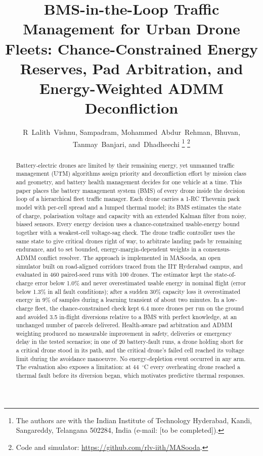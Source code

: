 \documentclass[journal]{IEEEtran}
\begin{document}
\title{BMS-in-the-Loop Traffic Management for Urban Drone Fleets: Chance-Constrained Energy Reserves, Pad Arbitration, and Energy-Weighted ADMM Deconfliction}

\author{R~Lalith~Vishnu,
        Sampadram,
        Mohammed~Abdur~Rehman,
        Bhuvan,
        Tanmay~Banjari,
        and~Dhadheechi%
\thanks{The authors are with the Indian Institute of Technology Hyderabad, Kandi, Sangareddy, Telangana 502284, India (e-mail: [to be completed]).}%
\thanks{Code and simulator: \protect\url{https://github.com/rlv-iith/MASooda}.}}


\maketitle

\begin{abstract}
Battery-electric drones are limited by their remaining energy, yet unmanned traffic management (UTM) algorithms assign priority and deconfliction effort by mission class and geometry, and battery health management decides for one vehicle at a time. This paper places the battery management system (BMS) of every drone inside the decision loop of a hierarchical fleet traffic manager. Each drone carries a 1-RC Thevenin pack model with per-cell spread and a lumped thermal model; its BMS estimates the state of charge, polarisation voltage and capacity with an extended Kalman filter from noisy, biased sensors. Every energy decision uses a chance-constrained usable-energy bound together with a weakest-cell voltage-sag check. The drone traffic controller uses the same state to give critical drones right of way, to arbitrate landing pads by remaining endurance, and to set bounded, energy-margin-dependent weights in a consensus-ADMM conflict resolver. The approach is implemented in MASooda, an open simulator built on road-aligned corridors traced from the IIT Hyderabad campus, and evaluated in 460 paired-seed runs with 100 drones. The estimator kept the state-of-charge error below 1.0\% and never overestimated usable energy in nominal flight (error below 1.3\% in all fault conditions); after a sudden 30\% capacity loss it overestimated energy in 9\% of samples during a learning transient of about two minutes. In a low-charge fleet, the chance-constrained check kept 6.4 more drones per run on the ground and avoided 3.5 in-flight diversions relative to a BMS with perfect knowledge, at an unchanged number of parcels delivered. Health-aware pad arbitration and ADMM weighting produced no measurable improvement in safety, deliveries or emergency delay in the tested scenarios; in one of 20 battery-fault runs, a drone holding short for a critical drone stood in its path, and the critical drone's failed cell reached its voltage limit during the avoidance manoeuvre. No energy-depletion event occurred in any arm. The evaluation also exposes a limitation: at 44~$^\circ$C every overheating drone reached a thermal fault before its diversion began, which motivates predictive thermal responses.
\end{abstract}
\end{document}
